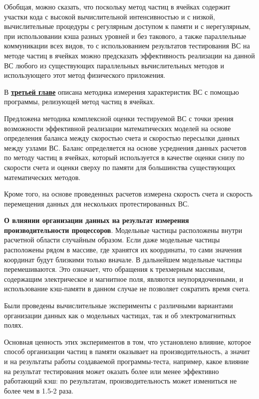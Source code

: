 Обобщая, можно сказать, что поскольку метод частиц в ячейках содержит участки кода с высокой вычислительной интенсивностью и с низкой, вычислительные процедуры с регулярным доступом к памяти и с нерегулярным, при использовании кэша разных уровней и без такового, а также параллельные коммуникации всех видов, то с использованием результатов тестирования ВС на методе частиц в ячейках можно предсказать эффективность реализации на данной ВС любого из существующих параллельных вычислительных методов и использующего этот метод физического приложения.

В \underline{\textbf{третьей главе}} описана методика измерения характеристик ВС с помощью программы, релизующей метод частиц в ячейках. 

Предложена методика комплексной оценки тестируемой ВС с точки зрения возможности эффективной реализации математических моделей на основе определения баланса между скоростью счета и скоростью пересылки данных между узлами ВС. Баланс определяется на основе усреднения данных расчетов по методу частиц в ячейках, который используется в качестве оценки снизу по скорости счета и оценки сверху по памяти для большинства существующих математических методов.

Кроме того, на основе проведенных расчетов измерена скорость счета и скорость перемещения данных для нескольких протестированных ВС.

\textbf{О влиянии организации данных на результат измерения производительности процессоров}.
Модельные частицы расположены внутри расчетной области случайным образом. Если даже модельные частицы расположены рядом в массиве, где хранятся их координаты,  то сами значения координат будут близкими только вначале. В дальнейшем модельные частицы перемешиваются. Это означает, что обращения к трехмерным массивам, содержащим электрическое и магнитное поля, являются неупорядоченными,  и использование кэш-памяти в данном случае не позволяет сократить время счета. 

Были проведены вычислительные эксперименты с различными вариантами организации данных как о модельных частицах, так и об электромагнитных полях.

Основная ценность этих экспериментов в том, что установлено влияние, которое способ организации частиц в памяти оказывает на производительность, а значит и на результаты работы создаваемой программы-теста, например, какое влияние на результат тестирования может оказать более или менее эффективно работающий кэш: по результатам, производительность может измениться не более чем в 1.5-2 раза.

